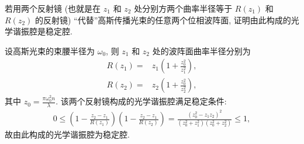 \documentclass{note}
\begin{document}
\begin{exe}
    若用两个反射镜 (也就是在 $z_1$ 和 $z_2$ 处分别方两个曲率半径等于 $R(z_1)$ 和 $R(z_2)$ 的反射镜) ``代替''高斯传播光束的任意两个位相波阵面, 证明由此构成的光学谐振腔是稳定腔.
\end{exe}
\begin{pf}
    设高斯光束的束腰半径为 $\omega_0$, 则 $z_1$ 和 $z_2$ 处的波阵面曲率半径分别为
    \begin{align}
        R(z_1)=&z_1\left(1+\frac{z_0^2}{z_1^2}\right),\\
        R(z_2)=&z_2\left(1+\frac{z_0^2}{z_2^2}\right),
    \end{align}
    其中 $z_0=\frac{\pi\omega_0^2n}{\lambda}$.
    该两个反射镜构成的光学谐振腔满足稳定条件:
    \begin{align}
        0\leq\left(1-\frac{z_2-z_1}{R(z_1)}\right)\left(1-\frac{z_2-z_1}{R(z_2)}\right)=\frac{(z_0^2-z_1z_2)^2}{(z_0^2+z_1^2)(z_0^2+z_2^2)}\leq 1,
    \end{align}
    故由此构成的光学谐振腔为稳定腔.
\end{pf}
\end{document}
